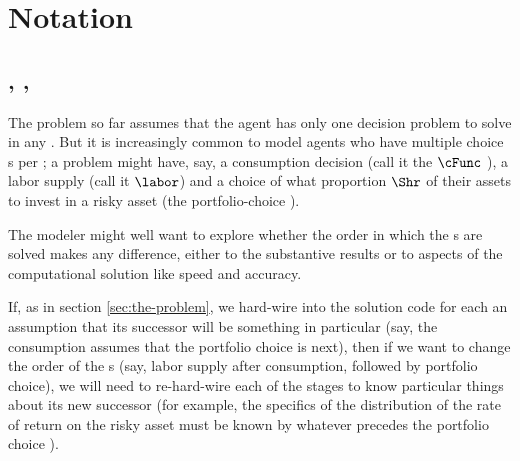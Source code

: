 \documentclass[SolvingMicroDSOPs]{subfiles}
\begin{document}
\hypertarget{notation}{}
\section{Notation}\label{sec:notation}

\subsection{\Intervals, \Stgs, \Moves}

The problem so far assumes that the agent has only one decision problem to solve in any {\interval}.  But it is increasingly common to model agents who have multiple choice {\stg}s per {\interval}; a problem might have, say, a consumption decision (call it the $\cFunc$ {\stg}), a labor supply {\stg} (call it $\labor$) and a choice of what proportion $\Shr$ of their assets to invest in a risky asset (the portfolio-choice {\stg}).

The modeler might well want to explore whether the order in which the {\stg}s are solved makes any difference, either to the substantive results or to aspects of the computational solution like speed and accuracy.

If, as in section \ref{sec:the-problem}, we hard-wire into the solution code for each {\stg} an assumption that its successor {\stg} will be something in particular (say, the consumption {\stg} assumes that the portfolio choice is next), then if we want to change the order of the {\stg}s (say, labor supply after consumption, followed by portfolio choice), we will need to re-hard-wire each of the stages to know particular things about its new successor (for example, the specifics of the distribution of the rate of return on the risky asset must be known by whatever {\stg} precedes the portfolio choice {\stg}).
\end{document}
